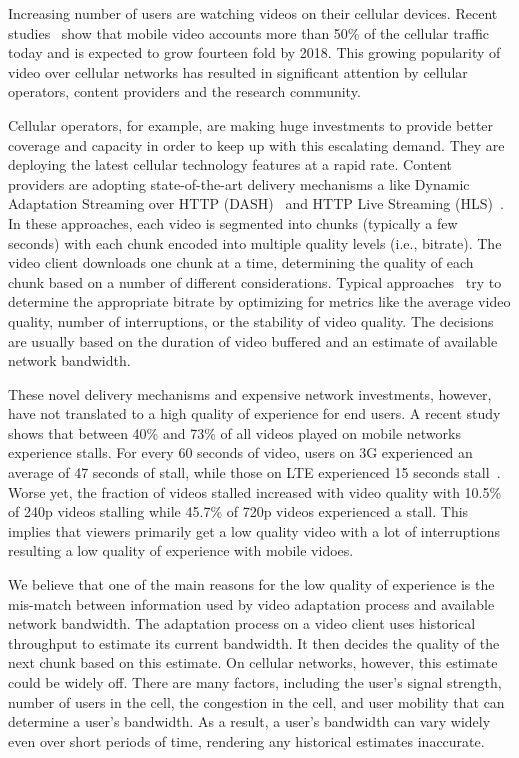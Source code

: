 Increasing number of users are watching videos on their cellular
devices. Recent studies~\cite{cisco-vni} show that mobile video
accounts more than 50\% of the cellular traffic today and is expected
to grow fourteen fold by 2018. This growing popularity of video over
cellular networks has resulted in significant attention by cellular
operators, content providers and the research community. 

Cellular operators, for example, are making huge investments to
provide better coverage and capacity in order to keep up with this
escalating demand. They are deploying the latest cellular technology
features at a rapid rate. Content providers are adopting
state-of-the-art delivery mechanisms a like Dynamic Adaptation
Streaming over HTTP (DASH)~\cite{DASH} and HTTP Live Streaming
(HLS)~\cite{HLS}. In these approaches, each video is segmented into chunks
(typically a few seconds) with each chunk encoded into multiple
quality levels (i.e., bitrate). The video client downloads one chunk
at a time, determining the quality of each chunk based on a number of
different considerations. Typical approaches~\cite{HLS,Festive,BBA}
try to determine the appropriate bitrate by optimizing for metrics
like the average video quality, number of interruptions, or the
stability of video quality. The decisions are usually based
on the duration of video buffered and an estimate of available network
bandwidth. 

These novel delivery mechanisms and expensive network investments,
however, have not translated to a high quality of experience for end
users. A recent study~\cite{opera-stall} shows that between 40\% and
73\% of all videos played on mobile networks experience stalls. For
every 60 seconds of video, users on 3G experienced an average of 47
seconds of stall, while those on LTE experienced 15 seconds
stall~\cite{citrix-stall}. Worse yet, the fraction of videos stalled
increased with video quality with 10.5\% of 240p videos stalling while
45.7\% of 720p videos experienced a stall. This implies that viewers
primarily get a low quality video with a lot of interruptions
resulting a low quality of experience with mobile vidoes.

We believe that one of the main reasons for the low quality of
experience is the mis-match between information used by video
adaptation process and available network bandwidth. The adaptation
process on a video client uses historical throughput to estimate its
current bandwidth. It then decides the quality of the next chunk based
on this estimate. On cellular networks, however, this estimate could
be widely off. There are many factors, including the user's signal
strength, number of users in the cell, the congestion in the cell, and
user mobility that can determine a user's bandwidth. As a result, a
user's bandwidth can vary widely even over short periods of time,
rendering any historical estimates inaccurate.

